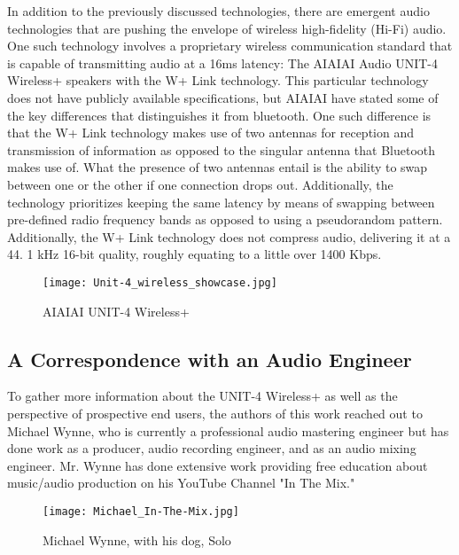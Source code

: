 \documentclass[conference]{IEEEtran}
\begin{document}
In addition to the previously discussed technologies, there are emergent audio technologies
that are pushing the envelope of wireless high-fidelity (Hi-Fi) audio. One such technology
involves a proprietary wireless communication standard that is capable of transmitting audio
at a 16ms latency: The AIAIAI Audio UNIT-4 Wireless+ speakers with the W+ Link technology.
This particular technology does not have publicly available specifications, but AIAIAI have
stated some of the key differences that distinguishes it from bluetooth. One such difference
is that the W+ Link technology makes use of two antennas for reception and transmission of
information as opposed to the singular antenna that Bluetooth makes use of. What the presence
of two antennas entail is the ability to swap between one or the other if one connection
drops out. Additionally, the technology prioritizes keeping the same latency by means of
swapping between pre-defined radio frequency bands as opposed to using a pseudorandom
pattern. Additionally, the W+ Link technology does not compress audio, delivering it at a 44.
1 kHz 16-bit quality, roughly equating to a little over 1400 Kbps.\cite{noauthor_unit-4_2023}

\begin{figure}[htbp]
    \centering
    \texttt{[image: Unit-4\_wireless\_showcase.jpg]}
    \caption{AIAIAI UNIT-4 Wireless+ \cite{noauthor_unit-4_2023}}
    \label{fig:unit-4_productPic}
\end{figure}

\subsection*{A Correspondence with an Audio Engineer}

To gather more information about the UNIT-4 Wireless+ as well as the perspective of prospective end users, the authors of this work reached out to Michael Wynne, who is currently a professional audio mastering engineer but has done work as a producer, audio recording engineer, and as an audio mixing engineer. Mr. Wynne has done extensive work providing free education about music/audio production on his YouTube Channel "In The Mix." \cite{wynne_i_nodate}

\begin{figure}[htbp]
    \centering
    \texttt{[image: Michael\_In-The-Mix.jpg]}
    \caption{Michael Wynne, with his dog, Solo}
    \label{fig:in-the-mix_portrait}
\end{figure}
\end{document}
